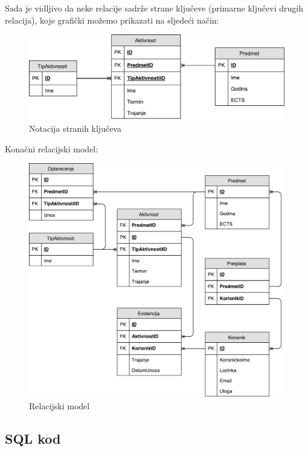 \documentclass[times, utf8, zavrsni]{fer}
\begin{document}
Sada je vidljivo da neke relacije sadrže strane ključeve (primarne ključevi drugih relacija), koje grafički možemo prikazati na sljedeći način:\\

\begin{figure}[H]
\centering
\includegraphics[width=\textwidth,height=\textheight,keepaspectratio]{img/strani-kljucevi.pdf}
\caption{Notacija stranih ključeva}
\label{fig:strani-kljucevi}
\end{figure}
\clearpage
Konačni relacijski model:\\

\begin{figure}[H]
\centering
\includegraphics[width=\textwidth,height=\textheight,keepaspectratio]{img/relacijski-model.pdf}
\caption{Relacijski model}
\label{fig:relacijski-model}
\end{figure}
\clearpage

\subsection{SQL kod}
\lstset{language=SQL, tabsize=4}

\end{document}
